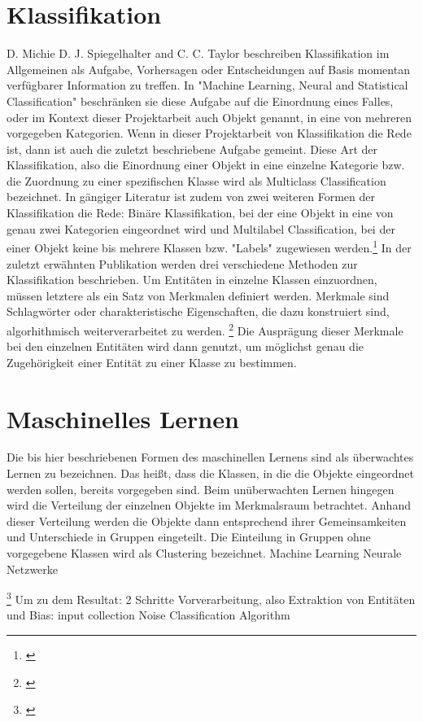 \section{Klassifikation}
D. Michie  D. J. Spiegelhalter  and C. C. Taylor beschreiben Klassifikation im Allgemeinen als Aufgabe, Vorhersagen oder Entscheidungen auf Basis momentan verfügbarer Information zu treffen. In "Machine Learning, Neural and Statistical Classification" beschränken sie diese Aufgabe auf die Einordnung eines Falles, oder im Kontext dieser Projektarbeit auch Objekt genannt, in eine von mehreren vorgegeben Kategorien. Wenn in dieser Projektarbeit von Klassifikation die Rede ist, dann ist auch die zuletzt beschriebene Aufgabe gemeint. Diese Art der Klassifikation, also die Einordnung einer Objekt in eine einzelne Kategorie bzw. die Zuordnung zu einer spezifischen Klasse wird als Multiclass Classification bezeichnet. In gängiger Literatur ist zudem von zwei weiteren Formen der Klassifikation die Rede: Binäre Klassifikation, bei der eine Objekt in eine von genau zwei Kategorien eingeordnet wird und Multilabel Classification, bei der einer Objekt keine bis mehrere Klassen bzw. "Labels" zugewiesen werden.\footnote{\cite{michie1994machine}}
In der zuletzt erwähnten Publikation werden drei verschiedene Methoden zur Klassifikation beschrieben.
Um Entitäten in einzelne Klassen einzuordnen, müssen letztere als ein Satz von Merkmalen definiert werden. Merkmale sind Schlagwörter oder charakteristische Eigenschaften, die dazu konstruiert sind, algorhithmisch weiterverarbeitet zu werden. \footnote{\cite{nadeau2007survey}} Die Ausprägung dieser Merkmale bei den einzelnen Entitäten wird dann genutzt, um möglichst genau die Zugehörigkeit einer Entität zu einer Klasse zu bestimmen.

\section{Maschinelles Lernen}
Die bis hier beschriebenen Formen des maschinellen Lernens sind als überwachtes Lernen zu bezeichnen. Das heißt, dass die Klassen, in die die Objekte eingeordnet werden sollen, bereits vorgegeben sind. Beim unüberwachten Lernen hingegen wird die Verteilung der einzelnen Objekte im Merkmalsraum betrachtet. Anhand dieser Verteilung werden die Objekte dann entsprechend ihrer Gemeinsamkeiten und Unterschiede in Gruppen eingeteilt. Die Einteilung in Gruppen ohne vorgegebene Klassen wird als Clustering bezeichnet.
Machine Learning
Neurale Netzwerke

\footnote{\cite{nadeau2007survey}}
Um zu dem Resultat: 2 Schritte Vorverarbeitung, also Extraktion von Entitäten und 
Bias: input collection
Noise
Classification Algorithm
